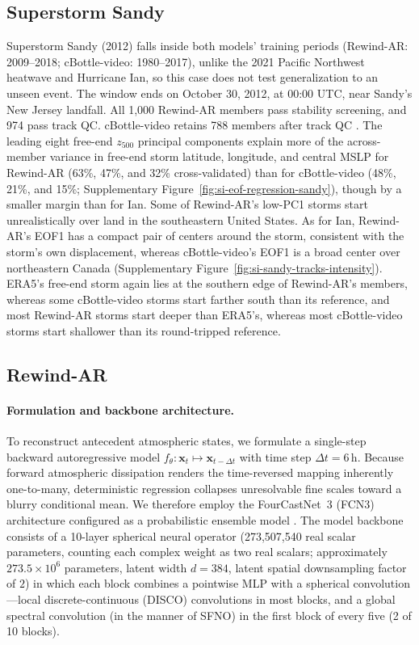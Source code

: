 \documentclass{article}
\begin{document}
\subsection{Superstorm Sandy}

Superstorm Sandy (2012) falls inside both models' training periods (Rewind-AR: 2009--2018; cBottle-video: 1980--2017), unlike the 2021 Pacific Northwest heatwave and Hurricane Ian, so this case does not test generalization to an unseen event. The window ends on October 30, 2012, at 00:00 UTC, near Sandy's New Jersey landfall. All 1,000 Rewind-AR members pass stability screening, and 974 pass track QC. cBottle-video retains 788 members after track QC \citep{Lin2026-sz}. The leading eight free-end $z_{500}$ principal components explain more of the across-member variance in free-end storm latitude, longitude, and central MSLP for Rewind-AR (63\%, 47\%, and 32\% cross-validated) than for cBottle-video (48\%, 21\%, and 15\%; Supplementary Figure~\ref{fig:si-eof-regression-sandy}), though by a smaller margin than for Ian. Some of Rewind-AR's low-PC1 storms start unrealistically over land in the southeastern United States. As for Ian, Rewind-AR's EOF1 has a compact pair of centers around the storm, consistent with the storm's own displacement, whereas cBottle-video's EOF1 is a broad center over northeastern Canada (Supplementary Figure~\ref{fig:si-sandy-tracks-intensity}). ERA5's free-end storm again lies at the southern edge of Rewind-AR's members, whereas some cBottle-video storms start farther south than its reference, and most Rewind-AR storms start deeper than ERA5's, whereas most cBottle-video storms start shallower than its round-tripped reference.

\clearpage

\subsection{Rewind-AR}
\label{sec:methods_fcn3_backward}

\paragraph{Formulation and backbone architecture.}
To reconstruct antecedent atmospheric states, we formulate a single-step backward autoregressive model $f_\theta: \mathbf{x}_t \mapsto \mathbf{x}_{t - \Delta t}$ with time step $\Delta t
  = 6\,\text{h}$. Because forward atmospheric dissipation renders the time-reversed mapping inherently one-to-many, deterministic regression collapses unresolvable fine scales
  toward a blurry conditional mean. We therefore employ the FourCastNet~3 (FCN3) architecture configured as a probabilistic ensemble model \citep{Bonev2025-dw}. The model backbone consists of a 10-layer spherical neural operator (273,507,540 real scalar parameters, counting each complex weight as two real scalars; approximately $273.5\times 10^6$ parameters, latent width $d=384$, latent spatial downsampling factor of $2$) in which each block combines a pointwise MLP with a spherical convolution---local discrete-continuous (DISCO) convolutions in most blocks, and a global spectral convolution (in the manner of SFNO) in the first block of every five (2 of 10 blocks).
\end{document}

